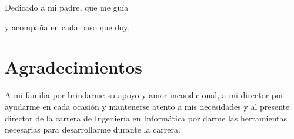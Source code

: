 \newenvironment{dedication}
{\clearpage           %
	\thispagestyle{empty}%
	\vspace*{\stretch{1}}%
	\itshape             %
	\raggedleft          %
}
{\par %
	\vspace{\stretch{3}} %
	\clearpage           %
}

\begin{dedication}
	Dedicado a mi padre, que me guía 
	
	y acompaña en cada paso que doy.
\end{dedication}

\section*{Agradecimientos}

A mi familia por brindarme su apoyo y amor incondicional, a mi director por ayudarme en cada ocasión y mantenerse atento a mis necesidades y al presente director de la carrera de Ingeniería en Informática por darme las herramientas necesarias para desarrollarme durante la carrera.
